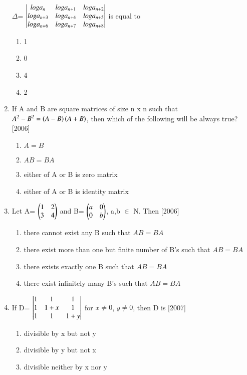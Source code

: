 \documentclass[journal,12pt,twocolumn]{IEEEtran}
\theoremstyle{remark}
\begin{document}
\begin{enumerate}
		$\Delta$= $\begin{vmatrix}
			loga_n & loga_{n+1} & loga_{n+2} \\
			loga_{n+3} & loga_{n+4} & loga_{n+5} \\
			loga_{n+6} & loga_{n+7} & loga_{n+8}\end{vmatrix}$ is equal to \\
		\begin{enumerate}
			\item 1
			\item 0
			\item 4
			\item 2 \\
		\end{enumerate}
	\item If A and B are square matrices of size n x n such that $A^2-B^2=\left(A-B\right)\left(A+B\right)$, then which of the following will be always true? \hfill{[2006]}
		\begin{enumerate}
			\item $A=B$
			\item $AB=BA$
			\item either of A or B is zero matrix
			\item either of A or B is identity matrix \\
		\end{enumerate}
	\item Let A= $\begin{pmatrix}
			1 & 2 \\
			3 & 4\end{pmatrix}$ and B= $\begin{pmatrix}
			a & 0 \\
			0 & b\end{pmatrix}$, a,b $\in$ N. Then \hfill{[2006]}
		\begin{enumerate}
			\item there cannot exist any B such that $AB=BA$
			\item there exist more than one but finite number of B's such that $AB=BA$
			\item there exists exactly one B such that $AB=BA$
			\item there exist infinitely many B's such that $AB=BA$ \\
		\end{enumerate}
	\item If D= $\begin{vmatrix}
			1 & 1 & 1 \\
			1 & 1+x & 1 \\
			1 & 1 & 1+y\end{vmatrix}$ for $x \neq 0$, $y \neq 0$, then D is \hfill{[2007]}
		\begin{enumerate}
			\item divisible by x but not y
			\item divisible by y but not x
			\item divisible neither by x nor y

\end{enumerate}
\end{enumerate}
\end{document}
